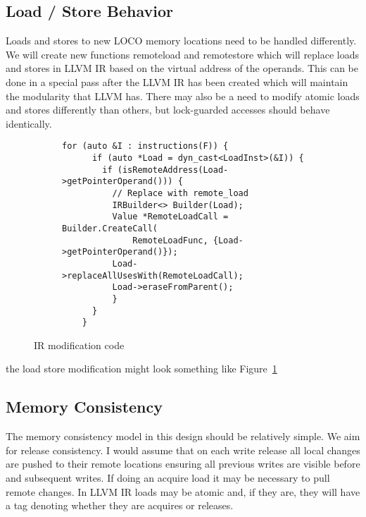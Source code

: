 \documentclass[sigplan,nonacm]{acmart}
\begin{document}
\subsection{Load / Store Behavior}
Loads and stores to new LOCO memory locations need to be handled differently. 
We will create new functions remoteload and remotestore which will replace
loads and stores in LLVM IR based on the virtual address of the operands.
This can be done in a special pass after the LLVM IR has been created which will maintain the 
modularity that LLVM has. There may also be a need to modify atomic loads and stores 
differently than others, but lock-guarded accesses should behave identically.

\begin{figure}
    \centering
    \begin{subfigure}{0.45\textwidth}
    \begin{lstlisting}[basicstyle={\ttfamily\scriptsize}]
    for (auto &I : instructions(F)) {
      if (auto *Load = dyn_cast<LoadInst>(&I)) {
        if (isRemoteAddress(Load->getPointerOperand())) {
          // Replace with remote_load
          IRBuilder<> Builder(Load);
          Value *RemoteLoadCall = Builder.CreateCall(
              RemoteLoadFunc, {Load->getPointerOperand()});
          Load->replaceAllUsesWith(RemoteLoadCall);
          Load->eraseFromParent();
          }
      }
    }
    \end{lstlisting}
    \end{subfigure}
    \caption{IR modification code}
    \label{fig:ir-modification}
    \end{figure}

the load store modification might look something like Figure~\ref{fig:ir-modification}



\subsection{Memory Consistency}
The memory consistency model in this design should be relatively simple. We aim for 
release consistency. I would assume that on each write release all local changes
are pushed to their remote locations ensuring all previous writes are visible before
and subsequent writes. If doing an acquire load it may be necessary to pull remote 
changes. In LLVM IR loads may be atomic and, if they are, they will have a tag 
denoting whether they are acquires or releases.
\end{document}
